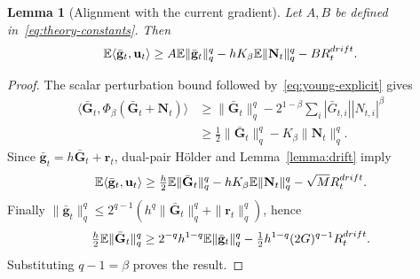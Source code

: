 \documentclass[10pt,a4paper]{amsart}
\newtheorem{lemma}{Lemma}
\begin{document}
\begin{lemma}[Alignment with the current gradient]\label{lemma:alignment}
Let $A,B$ be defined in~\eqref{eq:theory-constants}. Then
\begin{equation}\label{eq:alignment-correct}
\mathbb E\langle\bar{\mathbf{g}}_t,\mathbf{u}_t\rangle
\ge A\mathbb E\|\bar{\mathbf{g}}_t\|_q^q
-hK_\beta\mathbb E\|\mathbf{N}_t\|_q^q-BR_t^{\rm drift}.
\end{equation}
\end{lemma}
\begin{proof}
The scalar perturbation bound followed by~\eqref{eq:young-explicit} gives
\begin{align}
\langle\bar{\mathbf{G}}_t,\Phi_\beta(\bar{\mathbf{G}}_t+\mathbf{N}_t)\rangle
&\ge\|\bar{\mathbf{G}}_t\|_q^q-2^{1-\beta}\sum_i|\bar G_{t,i}||N_{t,i}|^\beta\nonumber\\
&\ge\tfrac12\|\bar{\mathbf{G}}_t\|_q^q-K_\beta\|\mathbf{N}_t\|_q^q.
\end{align}
Since $\bar{\mathbf{g}}_t=h\bar{\mathbf{G}}_t+\mathbf{r}_t$, dual-pair H\"older and Lemma~\ref{lemma:drift} imply
\begin{equation}
\mathbb E\langle\bar{\mathbf{g}}_t,\mathbf{u}_t\rangle
\ge\tfrac h2\mathbb E\|\bar{\mathbf{G}}_t\|_q^q-hK_\beta\mathbb E\|\mathbf{N}_t\|_q^q-\sqrt M R_t^{\rm drift}.
\end{equation}
Finally $\|\bar{\mathbf{g}}_t\|_q^q\le2^{q-1}(h^q\|\bar{\mathbf{G}}_t\|_q^q+\|\mathbf{r}_t\|_q^q)$, hence
\begin{equation}
\tfrac h2\mathbb E\|\bar{\mathbf{G}}_t\|_q^q
\ge2^{-q}h^{1-q}\mathbb E\|\bar{\mathbf{g}}_t\|_q^q
-\tfrac12h^{1-q}(2G)^{q-1}R_t^{\rm drift}.
\end{equation}
Substituting $q-1=\beta$ proves the result.
\end{proof}
\end{document}
